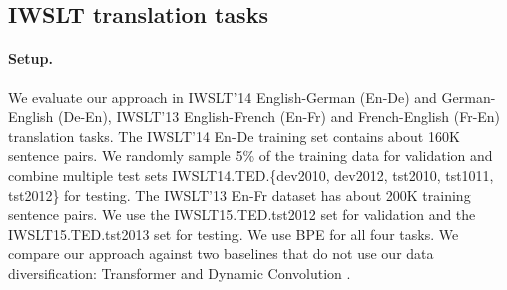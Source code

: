 \documentclass{article}
\begin{document}
\subsection{IWSLT translation tasks}\label{sec:iwslt}

\paragraph{Setup.}  {We evaluate our approach in IWSLT'14 English-German (En-De) and German-English (De-En), IWSLT'13 English-French (En-Fr) and French-English (Fr-En) translation tasks. The IWSLT’14
En-De training set contains about 160K sentence
pairs. We randomly sample 5\% of the training data for validation and combine multiple test
sets IWSLT14.TED.\{dev2010, dev2012, tst2010,
tst1011, tst2012\} for testing. The IWSLT’13 En-Fr
dataset has about 200K training sentence pairs. We
use the IWSLT15.TED.tst2012 set for validation
and the IWSLT15.TED.tst2013 set for testing.}
We use BPE for all four tasks. 
We compare our approach against two baselines that do not use our data diversification: Transformer \citep{vaswani2017attention} and Dynamic Convolution \citep{payless_wu2018}. 
\end{document}
